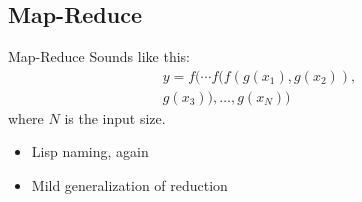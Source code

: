 \documentclass[english,compress]{beamer}
\begin{document}
\subsection{Map-Reduce}
\begin{frame}{Map-Reduce}
  Sounds like this:
  {\Huge
  \begin{multline*}
    y =  f(\cdots f(f(g(x_1), g(x_2)), \\
      g(x_3)), \dots ,g(x_N))
  \end{multline*}
  }
  where $N$ is the input size.

  \begin{itemize}
    \item Lisp naming, again
    \item Mild generalization of reduction
  \end{itemize}
\end{frame}
\end{document}
